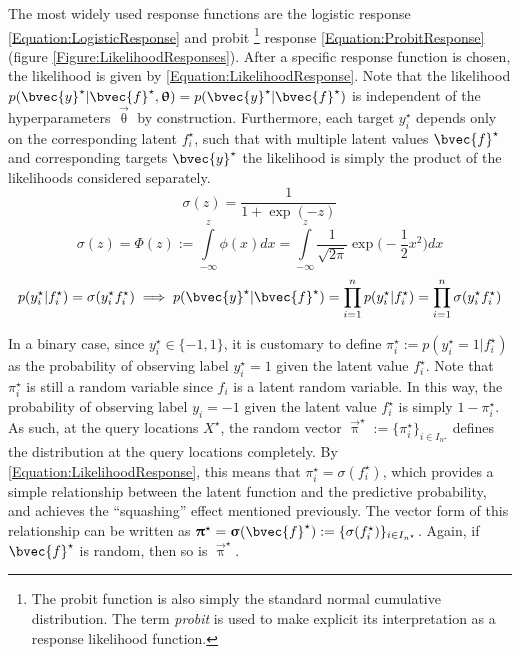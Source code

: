 				The most widely used response functions are the logistic response \eqref{Equation:LogisticResponse} and probit \footnote{The probit function is also simply the standard normal cumulative distribution. The term \textit{probit} is used to make explicit its interpretation as a response likelihood function.} response \eqref{Equation:ProbitResponse} (figure \ref{Figure:LikelihoodResponses}). After a specific response function is chosen, the likelihood is given by \eqref{Equation:LikelihoodResponse}. Note that the likelihood $p(\bvec{y}^{\star} | \bvec{f}^{\star}, \vec{\uptheta}) = p(\bvec{y}^{\star} | \bvec{f}^{\star})$ is independent of the hyperparameters $\vec{\uptheta}$ by construction. Furthermore, each target $y^{\star}_{i}$ depends only on the corresponding latent $f^{\star}_{i}$, such that with multiple latent values $\bvec{f}^{\star}$ and corresponding targets $\bvec{y}^{\star}$ the likelihood is simply the product of the likelihoods considered separately. \begin{equation}
					\sigma(z) = \frac{1}{1 + \exp(-z)}
				\label{Equation:LogisticResponse}
				\end{equation} \begin{equation}
					\sigma(z) = \Phi(z) := \int\limits_{-\infty}^{z} \phi(x) dx =  \int\limits_{-\infty}^{z} \frac{1}{\sqrt{2 \pi}} \exp\Big(- \frac{1}{2} x^{2}\Big) dx
				\label{Equation:ProbitResponse}
				\end{equation} \begin{equation}
					p(y^{\star}_{i} | f^{\star}_{i}) = \sigma(y^{\star}_{i} f^{\star}_{i}) \implies p(\bvec{y}^{\star} | \bvec{f}^{\star}) = \prod_{i = 1}^{n} p(y^{\star}_{i} | f^{\star}_{i}) = \prod_{i = 1}^{n} \sigma(y^{\star}_{i} f^{\star}_{i})
				\label{Equation:LikelihoodResponse}
				\end{equation}				
				
				In a binary case, since $y^{\star}_{i} \in \{-1, 1\}$, it is customary to define $\pi^{\star}_{i} := p(y^{\star}_{i} = 1 | f^{\star}_{i})$ as the probability of observing label $y^{\star}_{i} = 1$ given the latent value $f^{\star}_{i}$. Note that $\pi^{\star}_{i}$ is still a random variable since $f_{i}$ is a latent random variable. In this way, the probability of observing label $y_{i} = -1$ given the latent value $f^{\star}_{i}$ is simply $1 - \pi^{\star}_{i}$. As such, at the query locations $X^{\star}$, the random vector $\vec{\uppi}^{\star} := \{\pi^{\star}_{i}\}_{i \in I_{n^{\star}}}$ defines the distribution at the query locations completely. By \eqref{Equation:LikelihoodResponse}, this means that $\pi^{\star}_{i} = \sigma(f^{\star}_{i})$, which provides a simple relationship between the latent function and the predictive probability, and achieves the ``squashing'' effect mentioned previously. The vector form of this relationship can be written as $\vec{\uppi}^{\star} = \vec{\upsigma}(\bvec{f}^{\star}) := \{\sigma(f^{\star}_{i})\}_{i \in I_{n^{\star}}}$. Again, if $\bvec{f}^{\star}$ is random, then so is $\vec{\uppi}^{\star}$.
				
